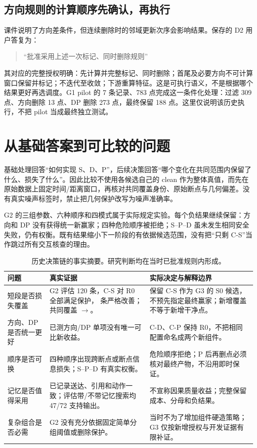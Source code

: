 \documentclass[11pt,a4paper]{article}
\begin{document}
\subsection{方向规则的计算顺序先确认，再执行}
课件说明了方向差条件，但连续删除时的邻域更新次序会影响结果。保存的 D2 用户答复为：
\begin{quote}“批准采用上述一次标记、同时删除规则”\end{quote}
其对应的完整授权明确：先计算并完整标记、同时删除；首尾及必要方向不可计算窗口保留并标记；不迭代至收敛；下游重算特征。这是可执行语义，不是根据哪个结果更好再选调度。G1 pilot 的 7 条记录、783 点完成这一条件化处理：过滤 309 点、方向删除 13 点、DP 删除 273 点，最终保留 188 点。这里仅说明该历史执行，不把 pilot 当成最终独立测试。

\section{从基础答案到可比较的问题}
基础处理回答“如何实现 S、D、P”，后续决策回答“哪个变化在共同范围内保留了什么、损失了什么”。因此比较不使用各候选自己的 clean 作为整体真值，而先在原始数据上固定时间/距离窗口，再核对共同覆盖身份、原始断点与几何偏差。没有真实噪声标签时，禁止把几何保护改写为噪声准确率。

G2 的三组参数、六种顺序和四模式属于实际规定实验。每个负结果继续保留：方向和 DP 没有获得统一新赢家；四种危险顺序被拒绝；S--P--D 虽未发生相同安全失败，仍有权衡。既有结果缩小下一阶段的有依据候选范围，没有把“只剩 C-S”当作跳过所有交互核查的理由。

\begin{table}[H]\centering\small\caption{历史决策链的事实摘要。研究判断均在当时已批准规则内形成。}\begin{tabularx}{\linewidth}{@{}p{26mm}Y Y@{}}\toprule 问题 & 真实证据 & 实际决定与解释边界 \\ \midrule
短段是否损失覆盖 & G2 评估 120 条，C-S 对 R0 全部满足保护，\CSStrictRecords{} 条严格改善；共同覆盖 \RZeroCovered{}$\to$\CSCovered{}。 & 保留 C-S 作为 G3 的 S0 候选，不预先指定最终赢家；新增覆盖不等于新增干净点。 \\
方向、DP 是否统一更好 & 已测方向/DP 单项没有唯一可比新收益。 & C-D、C-P 保持 R0，不把相同配置命名成两个新组件。 \\
顺序是否可换 & 四种顺序出现跨断点或断点信息损失；S--P--D 有真实权衡。 & 危险顺序拒绝；P 后再删点必须核对最终产物，不沿用即时保证。 \\
记忆是否值得采用 & 已记录送达、引用和动作一致；评估带/不带记忆搜索均 47/72 支持输出。 & 不宣称因果质量收益；完整保留成本、分母和负结果。 \\
复杂组合是否必需 & G2 没有充分依据固定简单分组阈值或删除保护。 & 当时不为了增加组件硬造策略；G3 仅按新增授权与开发证据有限补证。 \\
\bottomrule\end{tabularx}\end{table}
\end{document}

